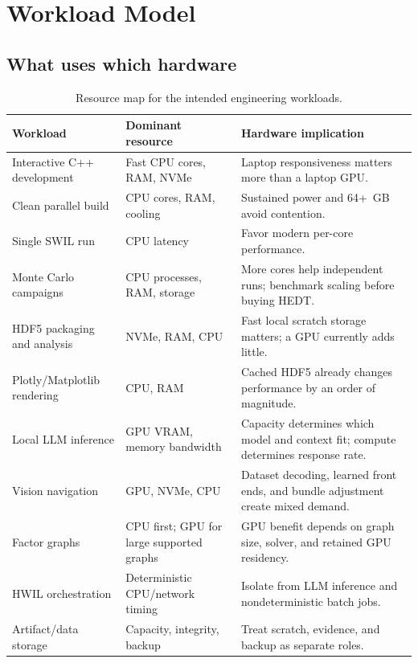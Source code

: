 \documentclass[11pt]{article}
\begin{document}
\section{Workload Model}

\subsection{What uses which hardware}

\begin{table}[htbp]
\centering
\small
\begin{tabularx}{\textwidth}{L{0.25\textwidth} L{0.23\textwidth} Y}
\toprule
Workload & Dominant resource & Hardware implication \\
\midrule
Interactive C++ development & Fast CPU cores, RAM, NVMe & Laptop responsiveness matters more than a laptop GPU. \\
Clean parallel build & CPU cores, RAM, cooling & Sustained power and 64+~GB avoid contention. \\
Single SWIL run & CPU latency & Favor modern per-core performance. \\
Monte Carlo campaigns & CPU processes, RAM, storage & More cores help independent runs; benchmark scaling before buying HEDT. \\
HDF5 packaging and analysis & NVMe, RAM, CPU & Fast local scratch storage matters; a GPU currently adds little. \\
Plotly/Matplotlib rendering & CPU, RAM & Cached HDF5 already changes performance by an order of magnitude. \\
Local LLM inference & GPU VRAM, memory bandwidth & Capacity determines which model and context fit; compute determines response rate. \\
Vision navigation & GPU, NVMe, CPU & Dataset decoding, learned front ends, and bundle adjustment create mixed demand. \\
Factor graphs & CPU first; GPU for large supported graphs & GPU benefit depends on graph size, solver, and retained GPU residency. \\
HWIL orchestration & Deterministic CPU/network timing & Isolate from LLM inference and nondeterministic batch jobs. \\
Artifact/data storage & Capacity, integrity, backup & Treat scratch, evidence, and backup as separate roles. \\
\bottomrule
\end{tabularx}
\caption{Resource map for the intended engineering workloads.}
\end{table}
\end{document}
